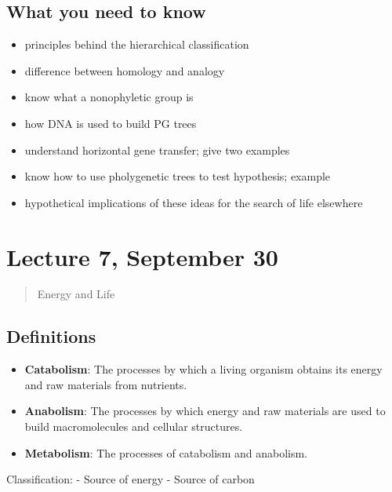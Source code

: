 \hypertarget{what-you-need-to-know-2}{%
\subsection{What you need to know}\label{what-you-need-to-know-2}}

\begin{itemize}
\tightlist
\item
  principles behind the hierarchical classification
\item
  difference between homology and analogy
\item
  know what a nonophyletic group is
\item
  how DNA is used to build PG trees
\item
  understand horizontal gene transfer; give two examples
\item
  know how to use pholygenetic trees to test hypothesis; example
\item
  hypothetical implications of these ideas for the search of life
  elsewhere
\end{itemize}

\hypertarget{lecture-7-september-30}{%
\section{Lecture 7, September 30}\label{lecture-7-september-30}}

\begin{quote}
Energy and Life
\end{quote}

\hypertarget{definitions}{%
\subsection{Definitions}\label{definitions}}

\begin{itemize}
\tightlist
\item
  \textbf{Catabolism}: The processes by which a living organism obtains
  its energy and raw materials from nutrients.
\item
  \textbf{Anabolism}: The processes by which energy and raw materials
  are used to build macromolecules and cellular structures.
\item
  \textbf{Metabolism}: The processes of catabolism and anabolism.
\end{itemize}

Classification: - Source of energy - Source of carbon

